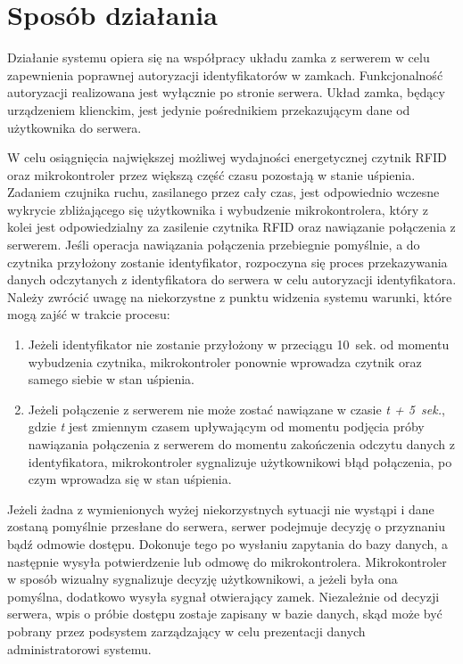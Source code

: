         \pagebreak

        \section{Sposób działania}
            Działanie systemu opiera się na współpracy układu zamka z serwerem w celu zapewnienia poprawnej autoryzacji identyfikatorów w zamkach. Funkcjonalność autoryzacji realizowana jest wyłącznie po stronie serwera. Układ zamka, będący urządzeniem klienckim, jest jedynie pośrednikiem przekazującym dane od użytkownika do serwera.

            W celu osiągnięcia największej możliwej wydajności energetycznej czytnik RFID oraz mikrokontroler przez większą część czasu pozostają w stanie uśpienia. Zadaniem czujnika ruchu, zasilanego przez cały czas, jest odpowiednio wczesne wykrycie zbliżającego się użytkownika i wybudzenie mikrokontrolera, który z kolei jest odpowiedzialny za zasilenie czytnika RFID oraz nawiązanie połączenia z serwerem. Jeśli operacja nawiązania połączenia przebiegnie pomyślnie, a do czytnika przyłożony zostanie identyfikator, rozpoczyna się proces przekazywania danych odczytanych z identyfikatora do serwera w celu autoryzacji identyfikatora. Należy zwrócić uwagę na niekorzystne z punktu widzenia systemu warunki, które mogą zajść w trakcie procesu:

            \begin{enumerate}
                \item
                    Jeżeli identyfikator nie zostanie przyłożony w przeciągu 10~sek. od momentu wybudzenia czytnika, mikrokontroler ponownie wprowadza czytnik oraz samego siebie w stan uśpienia.
                \item
                    Jeżeli połączenie z serwerem nie może zostać nawiązane w czasie \textit{t + 5~sek.}, gdzie \textit{t} jest zmiennym czasem upływającym od momentu podjęcia próby nawiązania połączenia z serwerem do momentu zakończenia odczytu danych z identyfikatora, mikrokontroler sygnalizuje użytkownikowi błąd połączenia, po czym wprowadza się w stan uśpienia.
            \end{enumerate}

            Jeżeli żadna z wymienionych wyżej niekorzystnych sytuacji nie wystąpi i dane zostaną pomyślnie przesłane do serwera, serwer podejmuje decyzję o przyznaniu bądź odmowie dostępu. Dokonuje tego po wysłaniu zapytania do bazy danych, a następnie wysyła potwierdzenie lub odmowę do mikrokontrolera. Mikrokontroler w sposób wizualny sygnalizuje decyzję użytkownikowi, a jeżeli była ona pomyślna, dodatkowo wysyła sygnał otwierający zamek. Niezależnie od decyzji serwera, wpis o próbie dostępu zostaje zapisany w bazie danych, skąd może być pobrany przez podsystem zarządzający w celu prezentacji danych administratorowi systemu.


